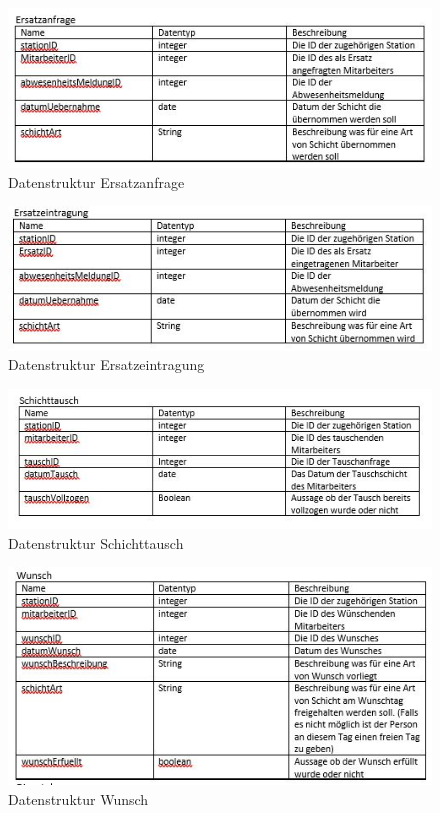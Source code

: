 \documentclass[11pt,
paper=a4,
bibtotocnumbered,	  %
liststotocnumbered,  %
DIV=calc,		  %
tablecaptionabove,	  %
headinclude,
]{article}
\begin{document}
\begin{figure}[H]
\includegraphics[width=1\textwidth]{Bilder/Dersatz.jpg}
\caption{Datenstruktur Ersatzanfrage}
\end{figure}
\begin{figure}[H]
\includegraphics[width=1\textwidth]{Bilder/Dersatz2.jpg}
\caption{Datenstruktur Ersatzeintragung}
\end{figure}
\begin{figure}[H]
\includegraphics[width=1\textwidth]{Bilder/Dschichttausch.jpg}
\caption{Datenstruktur Schichttausch}
\end{figure}
\begin{figure}[H]
\includegraphics[width=1\textwidth]{Bilder/Dwunsch.jpg}
\caption{Datenstruktur Wunsch}
\end{figure}
\end{document}
